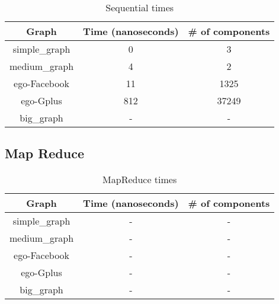 \begin{table}[h!]
\footnotesize
\begin{center}
\begin{tabular}{|c|c|c|}
\hline
{\bf Graph} & {\bf Time (nanoseconds)}& {\bf \# of components} \\
\hline
\hline
simple\_graph   & 0  & 3  \\
\hline
medium\_graph   & 4  & 2   \\
\hline
ego-Facebook   & 11  & 1325  \\
\hline
ego-Gplus   & 812 & 37249 \\
\hline
big\_graph   & -  & -  \\
\hline
\end{tabular}
\caption{Sequential times}
\label{tb:sequentialtimes}
\end{center}
\end{table}

\subsection{Map Reduce}

\begin{table}[h!]
\footnotesize
\begin{center}
\begin{tabular}{|c|c|c|}
\hline
{\bf Graph} & {\bf Time (nanoseconds)}& {\bf \# of components} \\
\hline
\hline
simple\_graph   & -  & -  \\
\hline
medium\_graph   & -  & -   \\
\hline
ego-Facebook   & -  & -  \\
\hline
ego-Gplus   & -  & -\\
\hline
big\_graph   & -  & -  \\
\hline
\end{tabular}
\caption{MapReduce times}
\label{tb:mapreducetimes}
\end{center}
\end{table}
